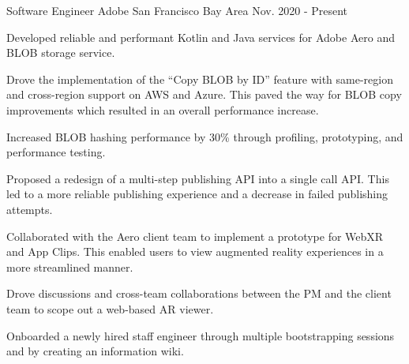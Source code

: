 


\begin{cventries}


\cventry
{Software Engineer} %
{Adobe} %
{San Francisco Bay Area} %
{Nov. 2020 - Present} %
{ %
\begin{cvitems}
\item {Developed reliable and performant Kotlin and Java services for Adobe Aero and BLOB storage service.}
\item {Drove the implementation of the ``Copy BLOB by ID'' feature with same-region and cross-region support on AWS and Azure. This paved the way for BLOB copy improvements which resulted in an overall performance increase.}
\item {Increased BLOB hashing performance by 30\% through profiling, prototyping, and performance testing.}
\item {Proposed a redesign of a multi-step publishing API into a single call API. This led to a more reliable publishing experience and a decrease in failed publishing attempts.}
\item {Collaborated with the Aero client team to implement a prototype for WebXR and App Clips. This enabled users to view augmented reality experiences in a more streamlined manner.}
\item {Drove discussions and cross-team collaborations between the PM and the client team to scope out a web-based AR viewer.}
\item {Onboarded a newly hired staff engineer through multiple bootstrapping sessions and by creating an information wiki.}
\end{cvitems}
}



\end{cventries}
